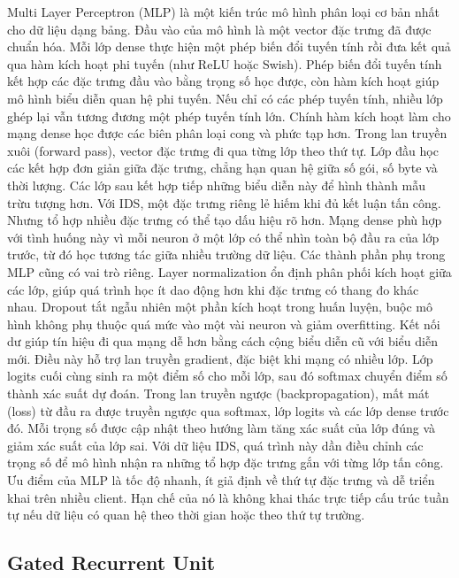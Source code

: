 Multi Layer Perceptron (MLP) là một kiến trúc mô hình phân loại cơ bản nhất cho dữ liệu dạng bảng. Đầu vào của mô hình là một vector đặc trưng đã được chuẩn hóa. Mỗi lớp dense thực hiện một phép biến đổi tuyến tính rồi đưa kết quả qua hàm kích hoạt phi tuyến (như ReLU hoặc Swish). Phép biến đổi tuyến tính kết hợp các đặc trưng đầu vào bằng trọng số học được, còn hàm kích hoạt giúp mô hình biểu diễn quan hệ phi tuyến. Nếu chỉ có các phép tuyến tính, nhiều lớp ghép lại vẫn tương đương một phép tuyến tính lớn. Chính hàm kích hoạt làm cho mạng dense học được các biên phân loại cong và phức tạp hơn.
\bigbreak\noindent
Trong lan truyền xuôi (forward pass), vector đặc trưng đi qua từng lớp theo thứ tự. Lớp đầu học các kết hợp đơn giản giữa đặc trưng, chẳng hạn quan hệ giữa số gói, số byte và thời lượng. Các lớp sau kết hợp tiếp những biểu diễn này để hình thành mẫu trừu tượng hơn. Với IDS, một đặc trưng riêng lẻ hiếm khi đủ kết luận tấn công. Nhưng tổ hợp nhiều đặc trưng có thể tạo dấu hiệu rõ hơn. Mạng dense phù hợp với tình huống này vì mỗi neuron ở một lớp có thể nhìn toàn bộ đầu ra của lớp trước, từ đó học tương tác giữa nhiều trường dữ liệu.
\bigbreak\noindent
Các thành phần phụ trong MLP cũng có vai trò riêng. Layer normalization ổn định phân phối kích hoạt giữa các lớp, giúp quá trình học ít dao động hơn khi đặc trưng có thang đo khác nhau. Dropout tắt ngẫu nhiên một phần kích hoạt trong huấn luyện, buộc mô hình không phụ thuộc quá mức vào một vài neuron và giảm overfitting. Kết nối dư giúp tín hiệu đi qua mạng dễ hơn bằng cách cộng biểu diễn cũ với biểu diễn mới. Điều này hỗ trợ lan truyền gradient, đặc biệt khi mạng có nhiều lớp. Lớp logits cuối cùng sinh ra một điểm số cho mỗi lớp, sau đó softmax chuyển điểm số thành xác suất dự đoán.
\bigbreak\noindent
Trong lan truyền ngược (backpropagation), mất mát (loss) từ đầu ra được truyền ngược qua softmax, lớp logits và các lớp dense trước đó. Mỗi trọng số được cập nhật theo hướng làm tăng xác suất của lớp đúng và giảm xác suất của lớp sai. Với dữ liệu IDS, quá trình này dần điều chỉnh các trọng số để mô hình nhận ra những tổ hợp đặc trưng gắn với từng lớp tấn công. Ưu điểm của MLP là tốc độ nhanh, ít giả định về thứ tự đặc trưng và dễ triển khai trên nhiều client. Hạn chế của nó là không khai thác trực tiếp cấu trúc tuần tự nếu dữ liệu có quan hệ theo thời gian hoặc theo thứ tự trường.

\subsection{Gated Recurrent Unit}

